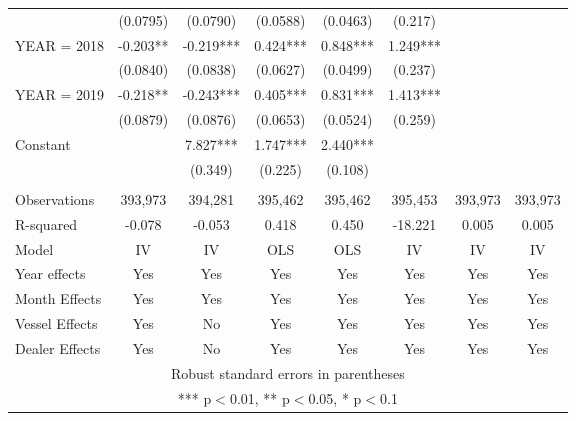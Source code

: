 \begin{tabular}{lccccccc}
 & (0.0795) & (0.0790) & (0.0588) & (0.0463) & (0.217) &  &  \\
YEAR = 2018 & -0.203** & -0.219*** & 0.424*** & 0.848*** & 1.249*** &  &  \\
 & (0.0840) & (0.0838) & (0.0627) & (0.0499) & (0.237) &  &  \\
YEAR = 2019 & -0.218** & -0.243*** & 0.405*** & 0.831*** & 1.413*** &  &  \\
 & (0.0879) & (0.0876) & (0.0653) & (0.0524) & (0.259) &  &  \\
Constant &  & 7.827*** & 1.747*** & 2.440*** &  &  &  \\
 &  & (0.349) & (0.225) & (0.108) &  &  &  \\
 &  &  &  &  &  &  &  \\
Observations & 393,973 & 394,281 & 395,462 & 395,462 & 395,453 & 393,973 & 393,973 \\
R-squared & -0.078 & -0.053 & 0.418 & 0.450 & -18.221 & 0.005 & 0.005 \\
Model & IV & IV & OLS & OLS & IV & IV & IV \\
Year effects & Yes & Yes & Yes & Yes & Yes & Yes & Yes \\
Month Effects & Yes & Yes & Yes & Yes & Yes & Yes & Yes \\
Vessel Effects & Yes & No & Yes & Yes & Yes & Yes & Yes \\
 Dealer Effects & Yes & No & Yes & Yes & Yes & Yes & Yes \\ \hline
\multicolumn{8}{c}{ Robust standard errors in parentheses} \\
\multicolumn{8}{c}{ *** p$<$0.01, ** p$<$0.05, * p$<$0.1} \\
\end{tabular}
